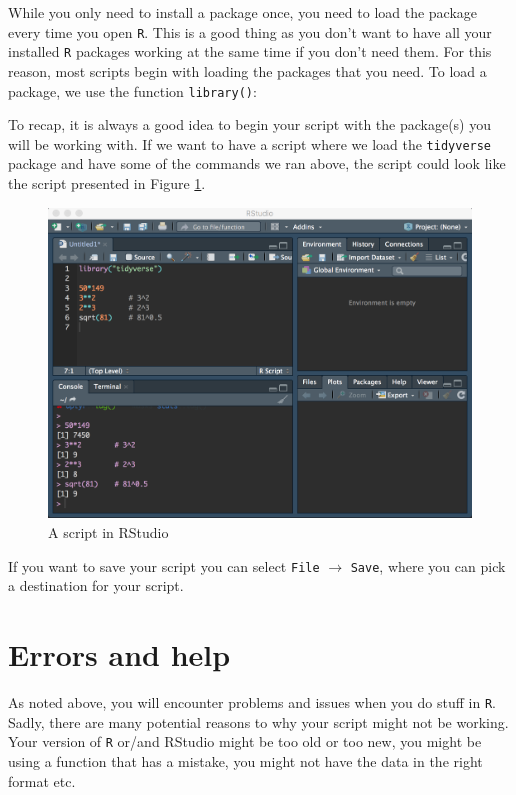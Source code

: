 \documentclass[12pt,oneside]{reedthesis}
\theoremstyle{definition}
\theoremstyle{definition}
\theoremstyle{definition}
\theoremstyle{remark}
\begin{document}
  While you only need to install a package once, you need to load the
  package every time you open \texttt{R}. This is a good thing as you
  don't want to have all your installed \texttt{R} packages working at the
  same time if you don't need them. For this reason, most scripts begin
  with loading the packages that you need. To load a package, we use the
  function \texttt{library()}:
  \begin{Shaded}
  \begin{Highlighting}[]
  \NormalTok{(}\NormalTok{)}
  \end{Highlighting}
  \end{Shaded}
  To recap, it is always a good idea to begin your script with the
  package(s) you will be working with. If we want to have a script where
  we load the \texttt{tidyverse} package and have some of the commands we
  ran above, the script could look like the script presented in Figure
  \ref{fig:interfacescript}.
  \begin{figure}
  \includegraphics[width=1\linewidth]{fig/rstudio_script} \caption{A script in RStudio}\label{fig:interfacescript}
  \end{figure}
  If you want to save your script you can select \texttt{File}
  \(\rightarrow\) \texttt{Save}, where you can pick a destination for your
  script.
  
  \section{Errors and help}\label{errors-and-help}
  
  As noted above, you will encounter problems and issues when you do stuff
  in \texttt{R}. Sadly, there are many potential reasons to why your
  script might not be working. Your version of \texttt{R} or/and RStudio
  might be too old or too new, you might be using a function that has a
  mistake, you might not have the data in the right format etc.
  
\end{document}
